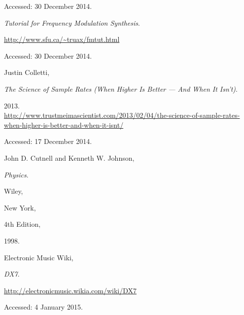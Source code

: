 \begin{thebibliography}{9}
  Accessed: 30 December 2014.


  \emph{Tutorial for Frequency Modulation Synthesis}.

  \url{http://www.sfu.ca/~truax/fmtut.html}

  Accessed: 30 December 2014.


  Justin Colletti,

  \emph{The Science of Sample Rates (When Higher Is Better --- And When It Isn't)}.

  2013.\\
  \url{http://www.trustmeimascientist.com/2013/02/04/the-science-of-sample-rates-when-higher-is-better-and-when-it-isnt/}

  Accessed: 17 December 2014.


  John D. Cutnell and Kenneth W. Johnson,

  \emph{Physics}.

  Wiley,

  New York,

  4th Edition,

  1998.


  Electronic Music Wiki,

  \emph{DX7}.

  \url{http://electronicmusic.wikia.com/wiki/DX7}

  Accessed: 4 January 2015.

\end{thebibliography}

